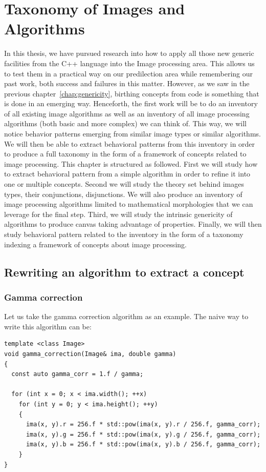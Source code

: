 \chapter{Taxonomy of Images and Algorithms}
\label{chap:image.algorithms.taxonomy}

In this thesis, we have pursued research into how to apply all those new generic facilities from the C++ language into
the Image processing area. This allows us to test them in a practical way on our predilection area while remembering our
past work, both success and failures in this matter. However, as we saw in the previous chapter~\ref{chap:genericity},
birthing concepts from code is something that is done in an emerging way. Henceforth, the first work will be to do an
inventory of all existing image algorithms as well as an inventory of all image processing algorithms (both basic and
more complex) we can think of. This way, we will notice behavior patterns emerging from similar image types or similar
algorithms. We will then be able to extract behavioral patterns from this inventory in order to produce a full taxonomy
in the form of a framework of concepts related to image processing. This chapter is structured as followed. First we
will study how to extract behavioral pattern from a simple algorithm in order to refine it into one or multiple
concepts. Second we will study the theory set behind images types, their conjunctions, disjunctions. We will also
produce an inventory of image processing algorithms limited to mathematical morphologies that we can leverage for the
final step. Third, we will study the intrinsic genericity of algorithms to produce canvas taking advantage of
properties. Finally, we will then study behavioral pattern related to the inventory in the form of a taxonomy indexing a
framework of concepts about image processing.

\section{Rewriting an algorithm to extract a concept}
\label{sec:rewriting}

\subsection{Gamma correction}
\label{subsec:gamma}

Let us take the gamma correction algorithm as an example. The naive way to write this algorithm can be:

\begin{verbatim}
template <class Image>
void gamma_correction(Image& ima, double gamma)
{
  const auto gamma_corr = 1.f / gamma;

  for (int x = 0; x < ima.width(); ++x)
    for (int y = 0; y < ima.height(); ++y)
    {
      ima(x, y).r = 256.f * std::pow(ima(x, y).r / 256.f, gamma_corr);
      ima(x, y).g = 256.f * std::pow(ima(x, y).g / 256.f, gamma_corr);
      ima(x, y).b = 256.f * std::pow(ima(x, y).b / 256.f, gamma_corr);
    }
}
\end{verbatim}

